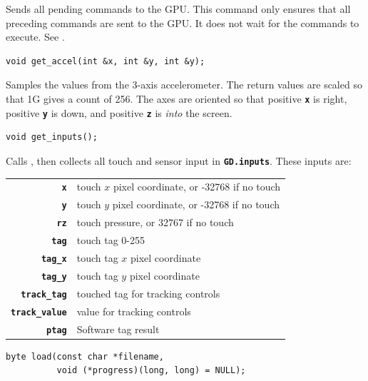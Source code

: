 \documentclass[10pt]{book}
\newcommand{\mach}[1]{\texttt{\textbf{#1}}}
\begin{document}
\begin{CJK}{UTF8}{gkai}
Sends all pending commands to the GPU.
This command only ensures that all preceding commands are sent to the GPU.
It does not wait for the commands to execute. See .


\begin{framed}
\begin{verbatim}
void get_accel(int &x, int &y, int &y);
\end{verbatim}
\end{framed}

Samples the values from the 3-axis accelerometer.
The return values are scaled so that 1G gives a count of 256.
The axes are oriented so that positive \mach{x} is right,
positive \mach{y} is down, and positive \mach{z} is \emph{into} the screen.


\begin{framed}
\begin{verbatim}
void get_inputs();
\end{verbatim}
\end{framed}

Calls , then
collects all touch and sensor input in \mach{GD.inputs}.
These inputs are:

\vspace{10pt}
\begin{tabular}{rl}
\mach{x} & touch $x$ pixel coordinate, or -32768 if no touch \\
\mach{y} & touch $y$ pixel coordinate, or -32768 if no touch \\
\mach{rz} & touch pressure, or 32767 if no touch \\
\mach{tag} & touch tag 0-255 \\
\mach{tag\_x} & touch tag $x$ pixel coordinate \\
\mach{tag\_y} & touch tag $y$ pixel coordinate \\
\mach{track\_tag} & touched tag for tracking controls \\
\mach{track\_value} & value for tracking controls \\
\mach{ptag} & Software tag result \\
\end{tabular}


\begin{framed}
\begin{verbatim}
byte load(const char *filename,
          void (*progress)(long, long) = NULL);
\end{verbatim}
\end{framed}


\end{CJK}
\end{document}
